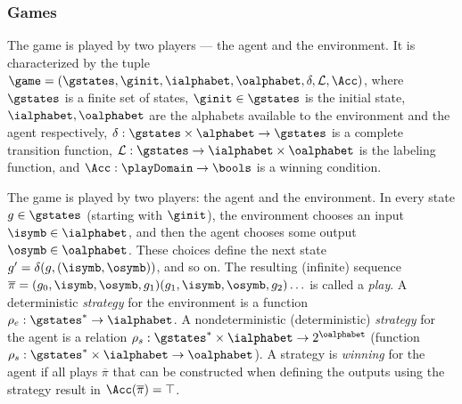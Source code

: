 \subsubsection{\textbf{Games}}
%
The game is played by two players --- the agent and the
environment. It is characterized by the tuple $\game = (\gstates,
\ginit, \ialphabet, \oalphabet, \delta,\mathcal L, \Acc)$,
where $\gstates$ is a finite set of states, $\ginit \in
\gstates$ is the initial state, $\ialphabet, \oalphabet$ are
the alphabets available to the environment and the agent respectively, 
$\delta: \gstates \times \alphabet \rightarrow \gstates$
is a complete transition function, $\mathcal L:\gstates
\rightarrow \ialphabet \times \oalphabet$ is the labeling
function, and $\Acc: \playDomain \rightarrow \bools$ is a
winning condition. 
%

The game is played  by two players: the agent and the
environment. In every state $g\in \gstates$ (starting with
$\ginit$), the environment chooses an input $\isymb \in
\ialphabet$, and then the agent chooses some output $\osymb
\in \oalphabet$. These choices define the next state $g' =
\delta(g,(\isymb, \osymb))$, and so on. The resulting
(infinite) sequence $\overline{\pi} = (g_0,\isymb, \osymb,
g_1) (g_1,\isymb, \osymb, g_2) \ldots$ is called a
\emph{play}.  A
    deterministic  \emph{strategy} for the environment is a
    function $\rho_e: \gstates^* \rightarrow \ialphabet$.  A
    nondeterministic (deterministic) \emph{strategy} for the
    agent is a relation $\rho_s: \gstates^* \times
    \ialphabet \rightarrow 2^{\oalphabet}$  (function
    $\rho_s: \gstates^* \times \ialphabet \rightarrow
    \oalphabet$). A strategy is
    \emph{winning} for the agent if all plays
    $\overline{\pi}$ that can be constructed when defining
    the outputs using the strategy result in
    $\Acc(\overline{\pi})=\top$. 


